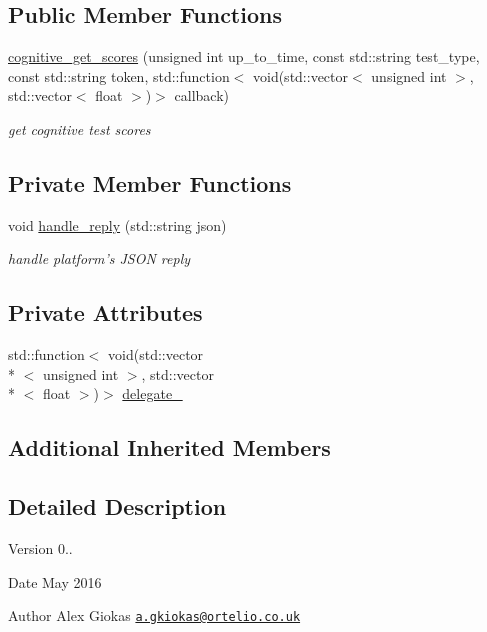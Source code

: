 \subsection*{Public Member Functions}
\begin{DoxyCompactItemize}
\item 
\hyperlink{classrapp_1_1cloud_1_1cognitive__get__scores_aff2009ecc53d8e68df85c6b56eb9e8e3}{cognitive\-\_\-get\-\_\-scores} (unsigned int up\-\_\-to\-\_\-time, const std\-::string test\-\_\-type, const std\-::string token, std\-::function$<$ void(std\-::vector$<$ unsigned int $>$, std\-::vector$<$ float $>$)$>$ callback)
\begin{DoxyCompactList}\small\item\em get cognitive test scores \end{DoxyCompactList}\end{DoxyCompactItemize}
\subsection*{Private Member Functions}
\begin{DoxyCompactItemize}
\item 
void \hyperlink{classrapp_1_1cloud_1_1cognitive__get__scores_a400e789b960692d96cb083bfa31db696}{handle\-\_\-reply} (std\-::string json)
\begin{DoxyCompactList}\small\item\em handle platform's J\-S\-O\-N reply \end{DoxyCompactList}\end{DoxyCompactItemize}
\subsection*{Private Attributes}
\begin{DoxyCompactItemize}
\item 
std\-::function$<$ void(std\-::vector\\*
$<$ unsigned int $>$, std\-::vector\\*
$<$ float $>$)$>$ \hyperlink{classrapp_1_1cloud_1_1cognitive__get__scores_abea342e51fba4fb0528f0bcdae020ab7}{delegate\-\_\-}
\end{DoxyCompactItemize}
\subsection*{Additional Inherited Members}


\subsection{Detailed Description}
\begin{DoxyVersion}{Version}
0.. 
\end{DoxyVersion}
\begin{DoxyDate}{Date}
May 2016 
\end{DoxyDate}
\begin{DoxyAuthor}{Author}
Alex Giokas \href{mailto:a.gkiokas@ortelio.co.uk}{\tt a.\-gkiokas@ortelio.\-co.\-uk} 
\end{DoxyAuthor}


